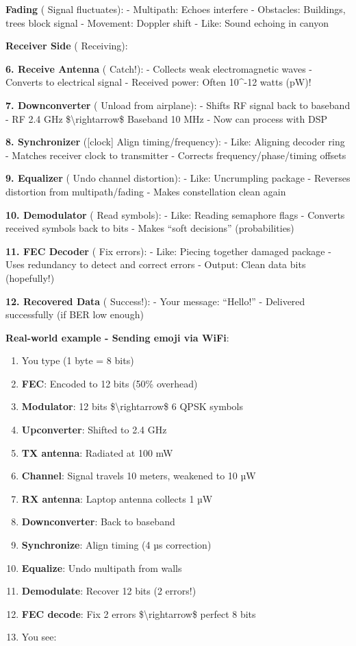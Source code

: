 \textbf{Fading} ( Signal fluctuates): - Multipath: Echoes interfere -
Obstacles: Buildings, trees block signal - Movement: Doppler shift -
Like: Sound echoing in canyon

\textbf{Receiver Side} ( Receiving):

\textbf{6. Receive Antenna} ( Catch!): - Collects weak electromagnetic
waves - Converts to electrical signal - Received power: Often 10\^{}-12
watts (pW)!

\textbf{7. Downconverter} ( Unload from airplane): - Shifts RF signal
back to baseband - RF 2.4 GHz \$\textbackslash rightarrow\$ Baseband 10
MHz - Now can process with DSP

\textbf{8. Synchronizer} ({[}clock{]} Align timing/frequency): - Like:
Aligning decoder ring - Matches receiver clock to transmitter - Corrects
frequency/phase/timing offsets

\textbf{9. Equalizer} ( Undo channel distortion): - Like: Uncrumpling
package - Reverses distortion from multipath/fading - Makes
constellation clean again

\textbf{10. Demodulator} ( Read symbols): - Like: Reading semaphore
flags - Converts received symbols back to bits - Makes ``soft
decisions'' (probabilities)

\textbf{11. FEC Decoder} ( Fix errors): - Like: Piecing together damaged
package - Uses redundancy to detect and correct errors - Output: Clean
data bits (hopefully!)

\textbf{12. Recovered Data} ( Success!): - Your message: ``Hello!'' -
Delivered successfully (if BER low enough)

\textbf{Real-world example - Sending emoji via WiFi}:

\begin{enumerate}
\def\labelenumi{\arabic{enumi}.}
\tightlist
\item
  You type (1 byte = 8 bits)
\item
  \textbf{FEC}: Encoded to 12 bits (50\% overhead)
\item
  \textbf{Modulator}: 12 bits \$\textbackslash rightarrow\$ 6 QPSK
  symbols
\item
  \textbf{Upconverter}: Shifted to 2.4 GHz
\item
  \textbf{TX antenna}: Radiated at 100 mW
\item
  \textbf{Channel}: Signal travels 10 meters, weakened to 10 µW
\item
  \textbf{RX antenna}: Laptop antenna collects 1 µW
\item
  \textbf{Downconverter}: Back to baseband
\item
  \textbf{Synchronize}: Align timing (4 µs correction)
\item
  \textbf{Equalize}: Undo multipath from walls
\item
  \textbf{Demodulate}: Recover 12 bits (2 errors!)
\item
  \textbf{FEC decode}: Fix 2 errors \$\textbackslash rightarrow\$
  perfect 8 bits
\item
  You see:
\end{enumerate}


